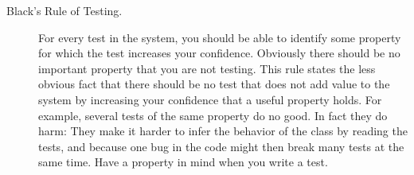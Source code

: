\documentclass[a4paper,10pt,twoside]{book}
\begin{document}
{\begin{description}
\item[Black's Rule of Testing.]
	For every test in the system, you should be able to identify some property for which the test increases your confidence.
	Obviously there should be no important property that you are not testing.
	This rule states the less obvious fact that there should be no test that does not add value to the system by increasing your confidence that a useful property holds.
	For example, several tests of the same property do no good.
	In fact they do harm:
	They make it harder to infer the behavior of the class by reading the tests, and because one bug in the code might then break many tests at the same time.
	Have a property in mind when you write a test.
\end{description}





}
\end{document}
